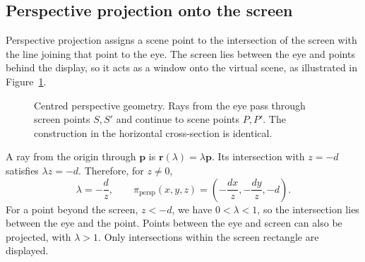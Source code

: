 \documentclass[11pt,a4paper]{article}
\newcommand{\vect}[1]{\boldsymbol{#1}}
\numberwithin{equation}{section}
\begin{document}
\newpage
\subsection{Perspective projection onto the screen}
Perspective projection assigns a scene point to the intersection of the screen with the line joining that point to the eye. The screen lies between the eye and points behind the display, so it acts as a window onto the virtual scene, as illustrated in Figure~\ref{fig:perspective}.

\begin{figure}[h!]
\centering
{}
\caption{Centred perspective geometry. Rays from the eye pass through screen points $S,S'$ and continue to scene points $P,P'$. The construction in the horizontal cross-section is identical.}
\label{fig:perspective}
\end{figure}

A ray from the origin through $\vect p$ is $\vect r(\lambda)=\lambda\vect p$. Its intersection with $z=-d$ satisfies $\lambda z=-d$. Therefore, for $z\ne0$,
\begin{equation}\label{eq:screen}
\lambda=-\frac d z,\qquad
\pi_{\mathrm{persp}}(x,y,z)=\left(-\frac{dx}{z},-\frac{dy}{z},-d\right).
\end{equation}
For a point beyond the screen, $z<-d$, we have $0<\lambda<1$, so the intersection lies between the eye and the point. Points between the eye and screen can also be projected, with $\lambda>1$. Only intersections within the screen rectangle are displayed.
\end{document}
